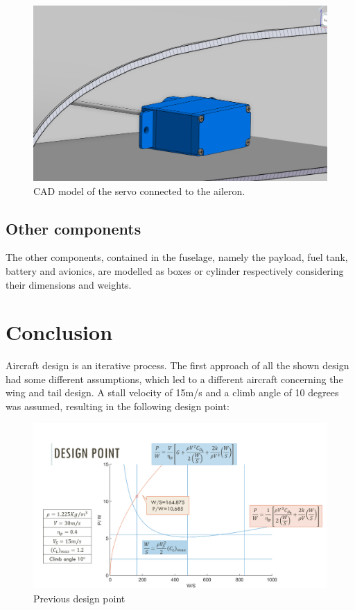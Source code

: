 \documentclass[english,fira]{ist-report}
\begin{document}
\begin{figure}[!ht]
	\centering
	\includegraphics[width = 1\linewidth]{graphics/cad/servoAileron1.png}
	\caption{CAD model of the servo connected to the aileron.}
	\label{fig:servo}
\end{figure}

\section{Other components}

The other components, contained in the fuselage, namely the payload, fuel tank, battery and avionics, are modelled as boxes or cylinder respectively considering their dimensions and weights.

\chapter{Conclusion}

Aircraft design is an iterative process. The first approach of all the shown design had some different assumptions, which led to a different aircraft concerning the wing and tail design. A stall velocity of 15m/s and a climb angle of 10 degrees was assumed, resulting in the following design point: 

\begin{figure}[!ht]
	\centering
	\includegraphics[width = 1\linewidth]{graphics/Old_design_point.png}
	\caption{Previous design point}
	\label{fig:oldpoint}
\end{figure}
\end{document}
